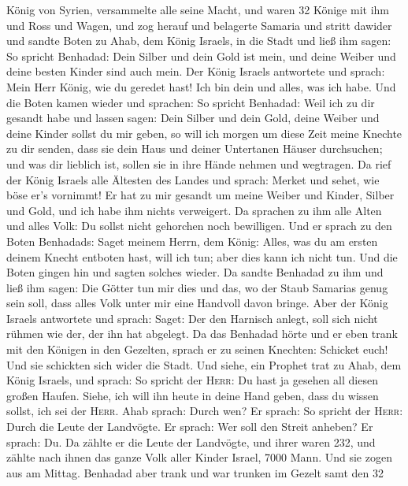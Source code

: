 König von Syrien, versammelte alle seine Macht, und waren 32 Könige mit
ihm und Ross und Wagen, und zog herauf und belagerte Samaria und stritt
dawider  und sandte Boten zu Ahab, dem König Israels, in
die Stadt  und ließ ihm sagen: So spricht Benhadad: Dein
Silber und dein Gold ist mein, und deine Weiber und deine besten Kinder
sind auch mein.  Der König Israels antwortete und sprach:
Mein Herr König, wie du geredet hast! Ich bin dein und alles, was ich
habe.  Und die Boten kamen wieder und sprachen: So spricht
Benhadad: Weil ich zu dir gesandt habe und lassen sagen: Dein Silber und
dein Gold, deine Weiber und deine Kinder sollst du mir geben,
 so will ich morgen um diese Zeit meine Knechte zu dir
senden, dass sie dein Haus und deiner Untertanen Häuser durchsuchen; und
was dir lieblich ist, sollen sie in ihre Hände nehmen und wegtragen.
 Da rief der König Israels alle Ältesten des Landes und
sprach: Merket und sehet, wie böse er's vornimmt! Er hat zu mir gesandt
um meine Weiber und Kinder, Silber und Gold, und ich habe ihm nichts
verweigert.  Da sprachen zu ihm alle Alten und alles Volk:
Du sollst nicht gehorchen noch bewilligen.  Und er sprach
zu den Boten Benhadads: Saget meinem Herrn, dem König: Alles, was du am
ersten deinem Knecht entboten hast, will ich tun; aber dies kann ich
nicht tun. Und die Boten gingen hin und sagten solches wieder.
 Da sandte Benhadad zu ihm und ließ ihm sagen: Die Götter
tun mir dies und das, wo der Staub Samarias genug sein soll, dass alles
Volk unter mir eine Handvoll davon bringe.  Aber der
König Israels antwortete und sprach: Saget: Der den Harnisch anlegt,
soll sich nicht rühmen wie der, der ihn hat abgelegt.  Da
das Benhadad hörte und er eben trank mit den Königen in den Gezelten,
sprach er zu seinen Knechten: Schicket euch! Und sie schickten sich
wider die Stadt.  Und siehe, ein Prophet trat zu Ahab,
dem König Israels, und sprach: So spricht der \textsc{Herr}: Du hast ja
gesehen all diesen großen Haufen. Siehe, ich will ihn heute in deine
Hand geben, dass du wissen sollst, ich sei der \textsc{Herr}.
 Ahab sprach: Durch wen? Er sprach: So spricht der
\textsc{Herr}: Durch die Leute der Landvögte. Er sprach: Wer soll den
Streit anheben? Er sprach: Du.  Da zählte er die Leute
der Landvögte, und ihrer waren 232, und zählte nach ihnen das ganze Volk
aller Kinder Israel, 7000 Mann.  Und sie zogen aus am
Mittag. Benhadad aber trank und war trunken im Gezelt samt den 32
